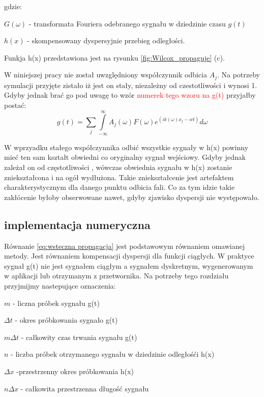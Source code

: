 gdzie:

$G(\omega)$ - transformata Fouriera odebranego sygnału w dziedzinie czasu $g(t)$

$h(x)$ - skompensowany dyspersyjnie przebieg odległości.

Funkja h(x) przedstawiona jest na rysunku \ref{fig:Wilcox_propaguje} (c).

W niniejszej pracy nie został uwzględniony współczynnik odbicia $A_j$. Na potrzeby symulacji przyjęte zistało iż jest on stały, niezależny od czestotliwości i wynosi 1. Gdyby jednak brać go pod uwagę to wzór \textcolor{red}{numerek tego wzoru na g(t)} przyjałby postać:
\begin{equation}
g(t) = \sum \limits _{j}\int\limits_{-\infty}^{\infty}A_j(\omega)F(\omega)e^(ik(\omega)x_j-wt)d\omega
\end{equation}

W wprzyadku stałego współczynnika odbić wszystkie sygnały w h(x) powinny mieć ten sam kształt obwiedni co oryginalny sygnał wejściowy. Gdyby jednak zależał on od częstotliwości , wówczas obwiednia sygnału w h(x) zostanie zniekształcona i na ogół wydłużona. Takie zniekształcenie jest artefaktem charakterystycznym dla danego punktu odbicia fali. Co za tym idzie takie zakłócenie byłoby obserwowane nawet, gdyby zjawisko dyspersji nie występowało. 

\subsection{implementacja numeryczna}
Równanie \ref{eq:wsteczna propagacja} jest podstawowym równaniem omawianej metody. Jest równaniem kompensacji dyspersji dla funkcji ciągłych. W praktyce sygnał g(t) nie jest sygnałem ciągłym a sygnałem dyskretnym, wygenerowanym w aplikacji lub otrzymanym z przetwornika. Na potrzeby tego rozdziału przyjmijmy nastepujące oznaczenia:

$m$ - liczna próbek sygnału g(t)

$\Delta t$ - okres próbkowania sygnało g(t)

$m\Delta t$ - całkowity czas trwania sygnału g(t)

$n$ - liczba próbek otrzymanego sygnału w dziedzinie odległośći h(x)

$\Delta x$ -przestrzenny okres próbkowania h(x)

$n\Delta x$ - całkowita przestrzenna długość sygnału


